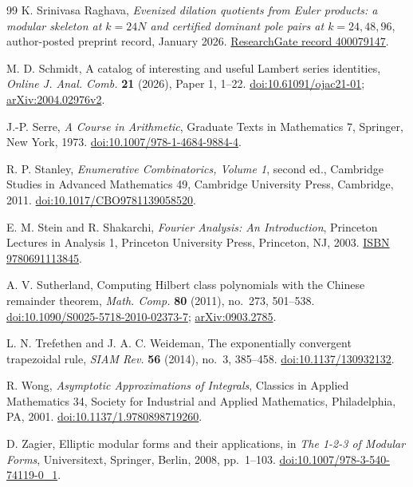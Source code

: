 \documentclass[11pt]{amsart}
\theoremstyle{definition}
\theoremstyle{remark}
\numberwithin{equation}{section}
\begin{document}
\begin{thebibliography}{99}
K. Srinivasa Raghava, \emph{Evenized dilation quotients from Euler products: a modular skeleton at $k=24N$ and certified dominant pole pairs at $k=24,48,96$}, author-posted preprint record, January 2026.
\href{https://www.researchgate.net/publication/400079147}{ResearchGate record 400079147}.

M. D. Schmidt, A catalog of interesting and useful Lambert series identities, \emph{Online J. Anal. Comb.} \textbf{21} (2026), Paper 1, 1--22.
\href{https://doi.org/10.61091/ojac21-01}{doi:10.61091/ojac21-01};
\href{https://arxiv.org/abs/2004.02976v2}{arXiv:2004.02976v2}.

J.-P. Serre, \emph{A Course in Arithmetic}, Graduate Texts in Mathematics 7, Springer, New York, 1973.
\href{https://doi.org/10.1007/978-1-4684-9884-4}{doi:10.1007/978-1-4684-9884-4}.

R. P. Stanley, \emph{Enumerative Combinatorics, Volume 1}, second ed., Cambridge Studies in Advanced Mathematics 49, Cambridge University Press, Cambridge, 2011.
\href{https://doi.org/10.1017/CBO9781139058520}{doi:10.1017/CBO9781139058520}.

E. M. Stein and R. Shakarchi, \emph{Fourier Analysis: An Introduction}, Princeton Lectures in Analysis 1, Princeton University Press, Princeton, NJ, 2003.
\href{https://press.princeton.edu/books/hardcover/9780691113845/fourier-analysis}{ISBN 9780691113845}.

A. V. Sutherland, Computing Hilbert class polynomials with the Chinese remainder theorem, \emph{Math. Comp.} \textbf{80} (2011), no.~273, 501--538.
\href{https://doi.org/10.1090/S0025-5718-2010-02373-7}{doi:10.1090/S0025-5718-2010-02373-7};
\href{https://arxiv.org/abs/0903.2785}{arXiv:0903.2785}.

L. N. Trefethen and J. A. C. Weideman, The exponentially convergent trapezoidal rule, \emph{SIAM Rev.} \textbf{56} (2014), no.~3, 385--458.
\href{https://doi.org/10.1137/130932132}{doi:10.1137/130932132}.

R. Wong, \emph{Asymptotic Approximations of Integrals}, Classics in Applied Mathematics 34, Society for Industrial and Applied Mathematics, Philadelphia, PA, 2001.
\href{https://doi.org/10.1137/1.9780898719260}{doi:10.1137/1.9780898719260}.

D. Zagier, Elliptic modular forms and their applications, in \emph{The 1-2-3 of Modular Forms}, Universitext, Springer, Berlin, 2008, pp.~1--103.
\href{https://doi.org/10.1007/978-3-540-74119-0_1}{doi:10.1007/978-3-540-74119-0\_1}.

\end{thebibliography}
\end{document}

